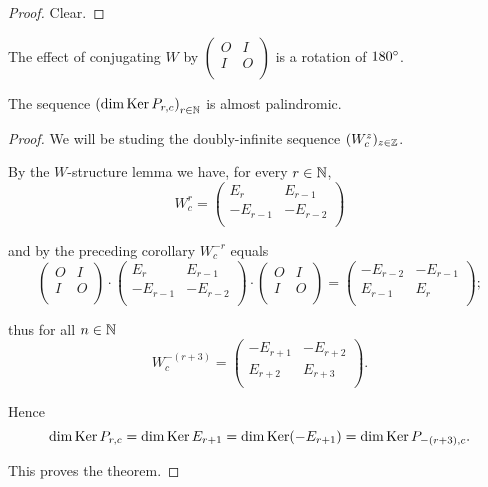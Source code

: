 \begin{proof}
  Clear.
\end{proof}

\begin{remark}
  The effect of conjugating $W$ by
  $\left(\begin{smallmatrix} O & I \\ I & O \\\end{smallmatrix}\right)$
  is a rotation of $180^{\circ}$.
\end{remark}

\begin{theorem}
  The sequence $\left(\dim\operatorname{Ker} P_{r,c}\right)_{r\in\mathbb{N}}$
  is almost palindromic.
\end{theorem}

\begin{proof}
  We will be studing the doubly-infinite sequence
  $(W_{c}^{z})_{z\in\mathbb{Z}}$.

  By the $W$-structure lemma we have, for every $r\in\mathbb{N}$,
  \[
  W_{c}^{r}
  =
  \left(
  \begin{array}{cc}
     E_{r} &  E_{r-1}  \\
    -E_{r-1} & -E_{r-2} \\
  \end{array}
  \right)
  \]

  and by the preceding corollary $W_{c}^{-r}$ equals
  \[
  \left(
  \begin{array}{cc}
    O & I \\
    I & O \\
  \end{array}
  \right)
  \cdot
  \left(
  \begin{array}{cc}
     E_{r} &  E_{r-1}  \\
    -E_{r-1} & -E_{r-2} \\
  \end{array}
  \right)
  \cdot
  \left(
  \begin{array}{cc}
    O & I \\
    I & O \\
  \end{array}
  \right)
  =
  \left(
  \begin{array}{cc}
    -E_{r-2}  & -E_{r-1} \\
     E_{r-1} & E_{r}     \\
  \end{array}
  \right);
  \]

  thus for all $n\in\mathbb{N}$
  \[
  W_{c}^{-(r+3)}
  =
  \left(
  \begin{array}{cc}
    -E_{r+1}  & -E_{r+2} \\
     E_{r+2} & E_{r+3} \\
  \end{array}
  \right).
  \]

  Hence
  \[
  \dim\operatorname{Ker} P_{r,c} =
  \dim\operatorname{Ker} E_{r+1} =
  \dim\operatorname{Ker}(-E_{r+1}) =
  \dim\operatorname{Ker} P_{-(r+3),c}.
  \]

  This proves the theorem.
\end{proof}
